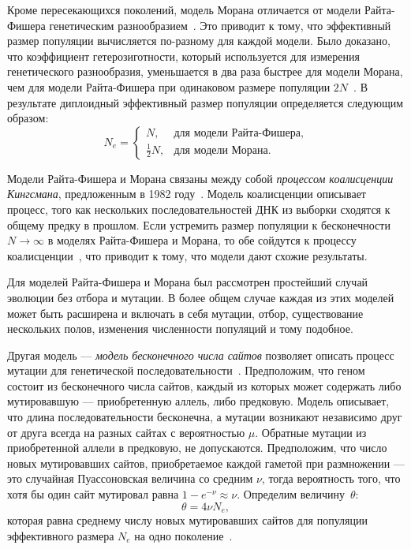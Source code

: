 Кроме пересекающихся поколений, модель Морана отличается от модели Райта-Фишера генетическим разнообразием~\cite{moran1958random}.
Это приводит к тому, что эффективный размер популяции вычисляется по-разному для каждой модели.
Было доказано, что коэффициент гетерозиготности, который используется для измерения генетического разнообразия, уменьшается в два раза быстрее для модели Морана, чем для модели Райта-Фишера при одинаковом размере популяции $2N$~\cite{moran1958random}.
В результате диплоидный эффективный размер популяции определяется следующим образом:
\begin{equation*}
    N_e = 
    \begin{cases}
      N, & \text{для модели Райта-Фишера}, \\
      \frac{1}{2}N, & \text{для модели Морана}.
    \end{cases}
\end{equation*}

Модели Райта-Фишера и Морана связаны между собой \emph{процессом коалисценции Кингсмана}, предложенным в 1982 году~\cite{kingman1982coalescent}.
Модель коалисценции описывает процесс, того как нескольких последовательностей ДНК из выборки сходятся к общему предку в прошлом.
Если устремить размер популяции к бесконечности $N \to \infty$ в моделях Райта-Фишера и Морана, то обе сойдутся к процессу коалисценции~\cite{wakeley2009coalescent}, что приводит к тому, что модели дают схожие результаты.

Для моделей Райта-Фишера и Морана был рассмотрен простейший случай эволюции без отбора и мутации. 
В более общем случае каждая из этих моделей может быть расширена и включать в себя мутации, отбор, существование нескольких полов, изменения численности популяций и тому подобное. 

Другая модель --- \emph{модель бесконечного числа сайтов} позволяет описать процесс мутации для генетической последовательности~\cite{watterson1975number}.
Предположим, что геном состоит из бесконечного числа сайтов, каждый из которых может содержать либо мутировавшую --- приобретенную аллель, либо предковую.
Модель описывает, что длина последовательности бесконечна, а мутации возникают независимо друг от друга всегда на разных сайтах с вероятностью $\mu$.
Обратные мутации из приобретенной аллели в предковую, не допускаются.
Предположим, что число новых мутировавших сайтов, приобретаемое каждой гаметой при размножении --- это случайная Пуассоновская величина со средним $\nu$, тогда вероятность того, что хотя бы один сайт мутировал равна $1-e^{-\nu} \approx \nu$.
Определим величину~$\theta$:
$$\theta = 4 \nu N_e,$$
которая равна среднему числу новых мутировавших сайтов для популяции эффективного размера $N_e$ на одно поколение~\cite{watterson1970effect}.

